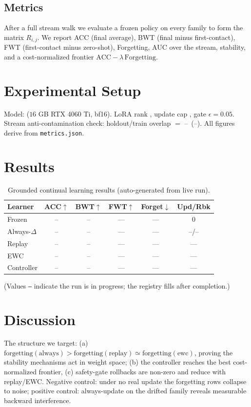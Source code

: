 \documentclass[10pt,conference]{IEEEtran}
\newcommand{\frozenacc}{--}\newcommand{\alwaysloraacc}{--}\newcommand{\replayacc}{--}%
\newcommand{\ewcacc}{--}\newcommand{\controlleracc}{--}
\newcommand{\frozenbwt}{--}\newcommand{\alwayslorabwt}{--}\newcommand{\replaybwt}{--}%
\newcommand{\ewcbwt}{--}\newcommand{\controllerbwt}{--}
\newcommand{\alwaysloraupdates}{--}\newcommand{\alwayslorarollbacks}{--}%
\newcommand{\canaryOverlap}{--}\newcommand{\canaryClean}{--}}
\begin{document}
\subsection{Metrics}
After a full stream walk we evaluate a frozen policy on every family to form the matrix $R_{i,j}$. We report ACC (final average), BWT (final minus first-contact), FWT (first-contact minus zero-shot), Forgetting, AUC over the stream, stability, and a cost-normalized frontier $\text{ACC} - \lambda\,\text{Forgetting}$.

\section{Experimental Setup}
Model: \texttt{\modelName} ($16$ GB RTX 4060 Ti, bf16). LoRA rank \loraRank, update cap \maxUpdates, gate $\epsilon=0.05$. Stream anti-contamination check: holdout/train overlap $=$ \canaryOverlap\ (\canaryClean). All figures derive from \texttt{metrics.json}.

\section{Results}
\begin{table}[htbp]
\centering
\caption{Grounded continual learning results (auto-generated from live run).}
\label{tab:cl}
\begin{tabular}{lccccc}
\toprule
Learner & ACC$\uparrow$ & BWT$\uparrow$ & FWT$\uparrow$ & Forget$\downarrow$ & Upd/Rbk \\
\midrule
Frozen     & \frozenacc     & \frozenbwt     & --- & --- & 0 \\
Always-$\Delta$ & \alwaysloraacc & \alwayslorabwt & --- & --- & \alwaysloraupdates/\alwayslorarollbacks \\
Replay     & \replayacc     & \replaybwt     & --- & --- & --- \\
EWC        & \ewcacc        & \ewcbwt        & --- & --- & --- \\
Controller & \controlleracc & \controllerbwt & --- & --- & --- \\
\bottomrule
\end{tabular}
\end{table}

(Values \texttt{--} indicate the run is in progress; the registry fills after completion.)

\section{Discussion}
The structure we target: (a) $\text{forgetting}(\text{always}) > \text{forgetting}(\text{replay}) \simeq \text{forgetting}(\text{ewc})$, proving the stability mechanisms act in weight space; (b) the controller reaches the best cost-normalized frontier, (c) safety-gate rollbacks are non-zero and reduce with replay/EWC. Negative control: under no real update the forgetting rows collapse to noise; positive control: always-update on the drifted family reveals measurable backward interference.
\end{document}
